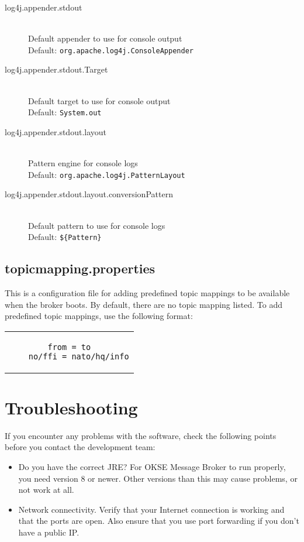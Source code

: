 \begin{description}
 \item[log4j.appender.stdout] \hfill \\
  Default appender to use for console output \hfill \\ Default: \verb!org.apache.log4j.ConsoleAppender!
   \item[log4j.appender.stdout.Target] \hfill \\
  Default target to use for console output \hfill \\ Default: \verb!System.out!
    \item[log4j.appender.stdout.layout] \hfill \\
  Pattern engine for console logs \hfill \\ Default: \verb!org.apache.log4j.PatternLayout!
   \item[log4j.appender.stdout.layout.conversionPattern] \hfill \\
  Default pattern to use for console logs \hfill \\ Default: \verb!${Pattern}!
  
 \end{description}
 
 \subsection{topicmapping.properties}
 \label{subsec:topicmapping.properties}
 
 This is a configuration file for adding predefined topic mappings to be available when the broker boots. By default, there are no topic mapping listed. To add predefined topic mappings, use the following format: 
 
 \begin{center}
\begin{tabular}{c}
\begin{lstlisting}[]
    from = to
    no/ffi = nato/hq/info
\end{lstlisting}
\end{tabular}
\end{center}

\section{Troubleshooting}

If you encounter any problems with the software, check the following points before you contact the development team: 

\begin{itemize}
\setlength{\itemsep}{0cm}%
\item Do you have the correct JRE? For OKSE Message Broker to run properly, you need version 8 or newer. Other versions than this may cause problems, or not work at all.
\item Network connectivity. Verify that your Internet connection is working and that the ports are open. Also ensure that you use port forwarding if you don't have a public IP.
\end{itemize}

\clearpage